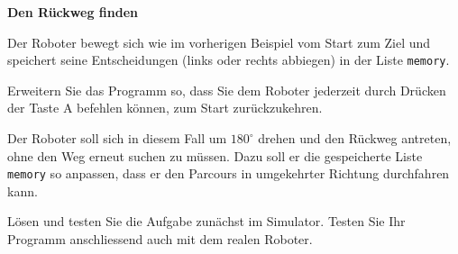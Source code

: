 \begin{mychallenge}
    \textbf{Den Rückweg finden}

    Der Roboter bewegt sich wie im vorherigen Beispiel
    vom Start zum Ziel und speichert seine Entscheidungen
    (links oder rechts abbiegen) in der Liste \texttt{memory}.

    Erweitern Sie das Programm so, dass Sie dem Roboter
    jederzeit durch Drücken der Taste A
    befehlen können, zum Start zurückzukehren.

    Der Roboter soll sich in diesem Fall um \(180^\circ\)
    drehen und den Rückweg antreten, ohne den Weg erneut
    suchen zu müssen. Dazu soll er die gespeicherte Liste
    \texttt{memory} so anpassen, dass er den Parcours
    in umgekehrter Richtung durchfahren kann.

    Lösen und testen Sie die Aufgabe zunächst im Simulator.
    Testen Sie Ihr Programm anschliessend auch mit dem
    realen Roboter.
\end{mychallenge}
